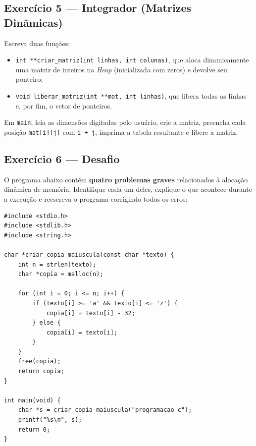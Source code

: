 \begin{exercicio}
\subsection*{Exercício 5 --- Integrador (Matrizes Dinâmicas)}
Escreva duas funções:
\begin{itemize}
    \item \texttt{int **criar\_matriz(int linhas, int colunas)}, que aloca dinamicamente uma matriz de inteiros na \textit{Heap} (inicializada com zeros) e devolve seu ponteiro;
    \item \texttt{void liberar\_matriz(int **mat, int linhas)}, que libera todas as linhas e, por fim, o vetor de ponteiros.
\end{itemize}
Em \texttt{main}, leia as dimensões digitadas pelo usuário, crie a matriz, preencha cada posição \texttt{mat[i][j]} com \texttt{i + j}, imprima a tabela resultante e libere a matriz.

\subsection*{Exercício 6 --- Desafio}
O programa abaixo contém \textbf{quatro problemas graves} relacionados à alocação dinâmica de memória. Identifique cada um deles, explique o que acontece durante a execução e reescreva o programa corrigindo todos os erros:

\begin{lstlisting}
#include <stdio.h>
#include <stdlib.h>
#include <string.h>

char *criar_copia_maiuscula(const char *texto) {
    int n = strlen(texto);
    char *copia = malloc(n);

    for (int i = 0; i <= n; i++) {
        if (texto[i] >= 'a' && texto[i] <= 'z') {
            copia[i] = texto[i] - 32;
        } else {
            copia[i] = texto[i];
        }
    }
    free(copia);
    return copia;
}

int main(void) {
    char *s = criar_copia_maiuscula("programacao c");
    printf("%s\n", s);
    return 0;
}
\end{lstlisting}

\end{exercicio}
